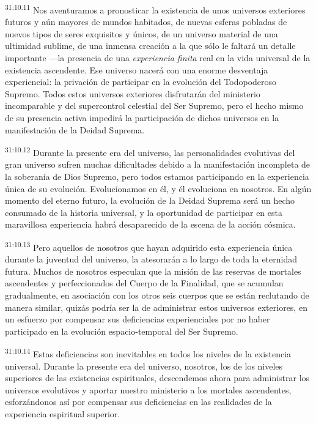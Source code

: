 \par
\textsuperscript{31:10.11} Nos aventuramos a pronosticar la existencia de unos universos exteriores futuros y aún mayores de mundos habitados, de nuevas esferas pobladas de nuevos tipos de seres exquisitos y únicos, de un universo material de una ultimidad sublime, de una inmensa creación a la que sólo le faltará un detalle importante ---la presencia de una \textit{experiencia finita} real en la vida universal de la existencia ascendente. Ese universo nacerá con una enorme desventaja experiencial: la privación de participar en la evolución del Todopoderoso Supremo. Todos estos universos exteriores disfrutarán del ministerio incomparable y del supercontrol celestial del Ser Supremo, pero el hecho mismo de su presencia activa impedirá la participación de dichos universos en la manifestación de la Deidad Suprema.

\par
\textsuperscript{31:10.12} Durante la presente era del universo, las personalidades evolutivas del gran universo sufren muchas dificultades debido a la manifestación incompleta de la soberanía de Dios Supremo, pero todos estamos participando en la experiencia única de su evolución. Evolucionamos en él, y él evoluciona en nosotros. En algún momento del eterno futuro, la evolución de la Deidad Suprema será un hecho consumado de la historia universal, y la oportunidad de participar en esta maravillosa experiencia habrá desaparecido de la escena de la acción cósmica.

\par
\textsuperscript{31:10.13} Pero aquellos de nosotros que hayan adquirido esta experiencia única durante la juventud del universo, la atesorarán a lo largo de toda la eternidad futura. Muchos de nosotros especulan que la misión de las reservas de mortales ascendentes y perfeccionados del Cuerpo de la Finalidad, que se acumulan gradualmente, en asociación con los otros seis cuerpos que se están reclutando de manera similar, quizás podría ser la de administrar estos universos exteriores, en un esfuerzo por compensar sus deficiencias experienciales por no haber participado en la evolución espacio-temporal del Ser Supremo.

\par
\textsuperscript{31:10.14} Estas deficiencias son inevitables en todos los niveles de la existencia universal. Durante la presente era del universo, nosotros, los de los niveles superiores de las existencias espirituales, descendemos ahora para administrar los universos evolutivos y aportar nuestro ministerio a los mortales ascendentes, esforzándonos así por compensar sus deficiencias en las realidades de la experiencia espiritual superior.

